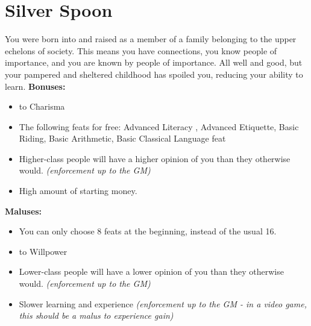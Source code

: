 \section{Silver Spoon}
You were born into and raised as a member of a family belonging to the upper echelons of society. This means you have connections, you know people of importance, and you are known by people of importance. All well and good, but your pampered and sheltered childhood has spoiled you, reducing your ability to learn.\newline
\textbf{Bonuses:}
\begin{itemize}
	\item {} to Charisma
	\item The following feats for free: Advanced Literacy , Advanced Etiquette, Basic Riding, Basic Arithmetic, Basic Classical Language feat 
	\item Higher-class people will have a higher opinion of you than they otherwise would. \textit{(enforcement up to the GM)}
	\item High amount of starting money.
\end{itemize}
\textbf{Maluses:}
\begin{itemize}
	\item You can only choose 8 feats at the beginning, instead of the usual 16.
	\item {} to Willpower
	\item Lower-class people will have a lower opinion of you than they otherwise would. \textit{(enforcement up to the GM)}
	\item Slower learning and experience \textit{(enforcement up to the GM - in a video game, this should be a malus to experience gain)}
\end{itemize}
